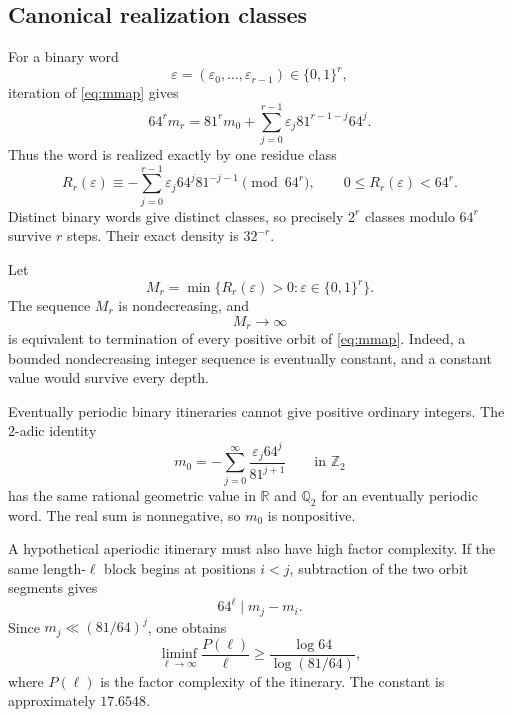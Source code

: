 \documentclass[11pt,reqno]{amsart}
\numberwithin{equation}{section}
\theoremstyle{definition}
\theoremstyle{remark}
\newcommand{\Q}{\mathbb Q}
\newcommand{\Ztwo}{\mathbb Z_2}
\newcommand{\eps}{\varepsilon}
\begin{document}
\subsection{Canonical realization classes}

For a binary word
\[
 \eps=(\eps_0,\ldots,\eps_{r-1})\in\{0,1\}^r,
\]
iteration of \eqref{eq:mmap} gives
\begin{equation}\label{eq:binaryunfold}
 64^r m_r
 =81^r m_0+
 \sum_{j=0}^{r-1}\eps_j81^{r-1-j}64^j.
\end{equation}
Thus the word is realized exactly by one residue class
\begin{equation}\label{eq:Rbinary}
 R_r(\eps)
 \equiv-
 \sum_{j=0}^{r-1}\eps_j64^j81^{-j-1}
 \pmod{64^r},
 \qquad 0\le R_r(\eps)<64^r.
\end{equation}
Distinct binary words give distinct classes, so precisely $2^r$ classes modulo $64^r$ survive $r$ steps.  Their exact density is $32^{-r}$.

Let
\begin{equation}\label{eq:Mr}
 M_r=\min\{R_r(\eps)>0:\eps\in\{0,1\}^r\}.
\end{equation}
The sequence $M_r$ is nondecreasing, and
\begin{equation}\label{eq:Mcriterion}
 M_r\longrightarrow\infty
\end{equation}
is equivalent to termination of every positive orbit of \eqref{eq:mmap}.  Indeed, a bounded nondecreasing integer sequence is eventually constant, and a constant value would survive every depth.

Eventually periodic binary itineraries cannot give positive ordinary integers.  The $2$-adic identity
\begin{equation}\label{eq:binary2adic}
 m_0=-\sum_{j=0}^{\infty}
 \frac{\eps_j64^j}{81^{j+1}}
 \qquad\text{in }\Ztwo
\end{equation}
has the same rational geometric value in $\mathbb R$ and $\Q_2$ for an eventually periodic word.  The real sum is nonnegative, so $m_0$ is nonpositive.

A hypothetical aperiodic itinerary must also have high factor complexity.  If the same length-$\ell$ block begins at positions $i<j$, subtraction of the two orbit segments gives
\[
 64^\ell\mid m_j-m_i.
\]
Since $m_j\ll(81/64)^j$, one obtains
\begin{equation}\label{eq:complexity}
 \liminf_{\ell\to\infty}
 \frac{P(\ell)}{\ell}
 \ge
 \frac{\log64}{\log(81/64)},
\end{equation}
where $P(\ell)$ is the factor complexity of the itinerary.  The constant is approximately $17.6548$.
\end{document}
